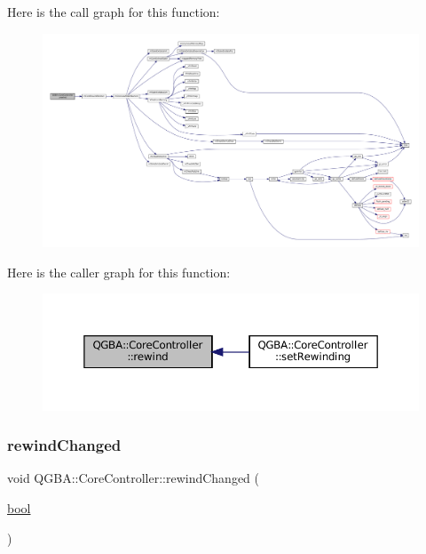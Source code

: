 Here is the call graph for this function\+:
\nopagebreak
\begin{figure}[H]
\begin{center}
\leavevmode
\includegraphics[width=350pt]{class_q_g_b_a_1_1_core_controller_a411c359b4192d9e461cdb7bdf2cb71e3_cgraph}
\end{center}
\end{figure}
Here is the caller graph for this function\+:
\nopagebreak
\begin{figure}[H]
\begin{center}
\leavevmode
\includegraphics[width=350pt]{class_q_g_b_a_1_1_core_controller_a411c359b4192d9e461cdb7bdf2cb71e3_icgraph}
\end{center}
\end{figure}
\mbox{\label{class_q_g_b_a_1_1_core_controller_a541c4befdaaa0506f685fe558b082095}} 
\subsubsection{\texorpdfstring{rewind\+Changed}{rewindChanged}}
{\footnotesize\ttfamily void Q\+G\+B\+A\+::\+Core\+Controller\+::rewind\+Changed (\begin{DoxyParamCaption}\item[{\mbox{\hyperlink{libretro_8h_a4a26dcae73fb7e1528214a068aca317e}{bool}}}]{ }\end{DoxyParamCaption})\hspace{0.3cm}{\ttfamily [signal]}}

